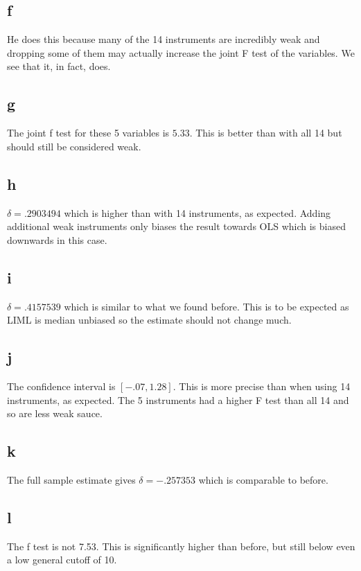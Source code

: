 \documentclass[11pt]{article}
\begin{document}
  \subsection{f}
  He does this because many of the 14 instruments are incredibly weak and dropping some of them may actually increase the joint F test of the variables. We see that it, in fact, does.  
  
  \subsection{g}
  The joint f test for these 5 variables is  $5.33$. This is better than with all 14 but should still be considered weak. 
  
  \subsection{h}
  $\delta = .2903494  $ which is higher than with 14 instruments, as expected. Adding additional weak instruments only biases the result towards OLS which is biased downwards in this case. 
  
  \subsection{i}
  $\delta = .4157539  $ which is similar to what we found before. This is to be expected as LIML is median unbiased so the estimate should not change much. 
  
  \subsection{j}
  The confidence interval is $ [    -.07,    1.28]$. This is more precise than when using 14 instruments, as expected. The 5 instruments had a higher F test than all 14 and so are less weak sauce. 
  
   \subsection{k}
  The full sample estimate gives $\delta =  -.257353  $ which is comparable to before. 
  
  \subsection{l}
  The f test is not 7.53. This is significantly higher than before, but still below even a low general cutoff of 10. 
  
\end{document}
